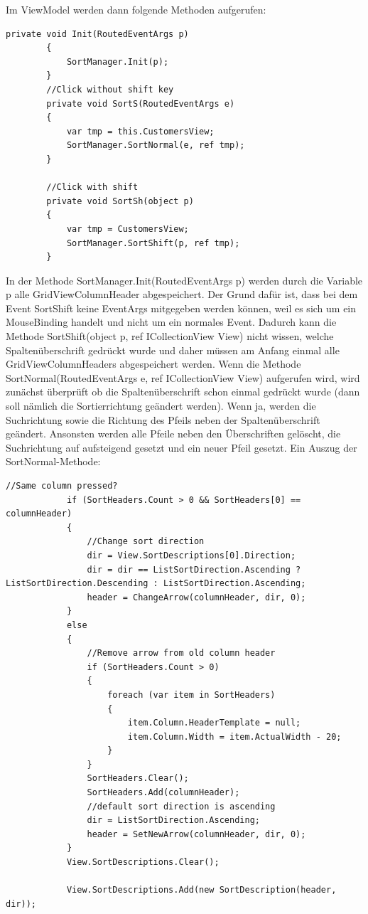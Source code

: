 Im ViewModel werden dann folgende Methoden aufgerufen:
\begin{lstlisting}
private void Init(RoutedEventArgs p)
        {
            SortManager.Init(p);
        }
        //Click without shift key
        private void SortS(RoutedEventArgs e)
        {
            var tmp = this.CustomersView;
            SortManager.SortNormal(e, ref tmp);
        }

        //Click with shift
        private void SortSh(object p)
        {
            var tmp = CustomersView;
            SortManager.SortShift(p, ref tmp);
        }
\end{lstlisting}
In der Methode SortManager.Init(RoutedEventArgs p) werden durch die Variable p alle GridViewColumnHeader abgespeichert. Der Grund dafür ist, dass bei dem Event SortShift keine EventArgs mitgegeben werden können, weil es sich um ein MouseBinding handelt und nicht um ein normales Event. Dadurch kann die Methode SortShift(object p, ref ICollectionView View) nicht wissen, welche Spaltenüberschrift gedrückt wurde und daher müssen am Anfang einmal alle GridViewColumnHeaders abgespeichert werden.
Wenn die Methode SortNormal(RoutedEventArgs e, ref ICollectionView View) aufgerufen wird, wird zunächst überprüft ob die Spaltenüberschrift schon einmal gedrückt wurde (dann soll nämlich die Sortierrichtung geändert werden). Wenn ja, werden die Suchrichtung sowie die Richtung des Pfeils neben der Spaltenüberschrift geändert. Ansonsten werden alle Pfeile neben den Überschriften gelöscht, die Suchrichtung auf aufsteigend gesetzt und ein neuer Pfeil gesetzt. Ein Auszug der SortNormal-Methode:
\begin{lstlisting}
//Same column pressed?
            if (SortHeaders.Count > 0 && SortHeaders[0] == columnHeader)
            {
                //Change sort direction
                dir = View.SortDescriptions[0].Direction;
                dir = dir == ListSortDirection.Ascending ? ListSortDirection.Descending : ListSortDirection.Ascending;
                header = ChangeArrow(columnHeader, dir, 0);
            }
            else
            {
                //Remove arrow from old column header
                if (SortHeaders.Count > 0)
                {
                    foreach (var item in SortHeaders)
                    {
                        item.Column.HeaderTemplate = null;
                        item.Column.Width = item.ActualWidth - 20;
                    }
                }
                SortHeaders.Clear();
                SortHeaders.Add(columnHeader);
                //default sort direction is ascending
                dir = ListSortDirection.Ascending;
                header = SetNewArrow(columnHeader, dir, 0);
            }
            View.SortDescriptions.Clear();

            View.SortDescriptions.Add(new SortDescription(header, dir));
\end{lstlisting}

